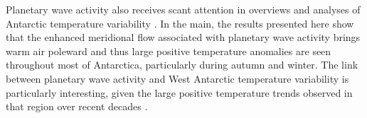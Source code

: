 Planetary wave activity also receives scant attention in overviews and analyses of Antarctic temperature variability \citep[e.g.][]{Russell2010,SchneiderOkumura2012,Yu2012}. In the main, the results presented here show that the enhanced meridional flow associated with planetary wave activity brings warm air poleward and thus large positive temperature anomalies are seen throughout most of Antarctica, particularly during autumn and winter. The link between planetary wave activity and West Antarctic temperature variability is particularly interesting, given the large positive temperature trends observed in that region over recent decades \citep[e.g.][]{Bromwich2013}.  

